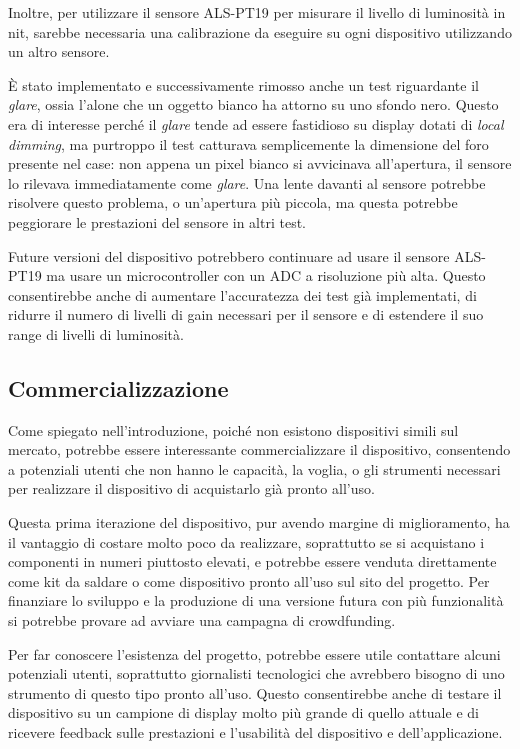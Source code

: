 Inoltre, per utilizzare il sensore ALS-PT19 per misurare il livello di luminosità in nit, sarebbe necessaria una calibrazione da eseguire su ogni dispositivo utilizzando un altro sensore.

È stato implementato e successivamente rimosso anche un test riguardante il \textit{glare}, ossia l'alone che un oggetto bianco ha attorno su uno sfondo nero. Questo era di interesse perché il \textit{glare} tende ad essere fastidioso su display dotati di \textit{local dimming}, ma purtroppo il test catturava semplicemente la dimensione del foro presente nel case: non appena un pixel bianco si avvicinava all'apertura, il sensore lo rilevava immediatamente come \textit{glare}. Una lente davanti al sensore potrebbe risolvere questo problema, o un'apertura più piccola, ma questa potrebbe peggiorare le prestazioni del sensore in altri test.

Future versioni del dispositivo potrebbero continuare ad usare il sensore ALS-PT19 ma usare un microcontroller con un ADC a risoluzione più alta. Questo consentirebbe anche di aumentare l'accuratezza dei test già implementati, di ridurre il numero di livelli di gain necessari per il sensore e di estendere il suo range di livelli di luminosità.

\subsection{Commercializzazione}
Come spiegato nell'introduzione, poiché non esistono dispositivi simili sul mercato, potrebbe essere interessante commercializzare il dispositivo, consentendo a potenziali utenti che non hanno le capacità, la voglia, o gli strumenti necessari per realizzare il dispositivo di acquistarlo già pronto all'uso.

Questa prima iterazione del dispositivo, pur avendo margine di miglioramento, ha il vantaggio di costare molto poco da realizzare, soprattutto se si acquistano i componenti in numeri piuttosto elevati, e potrebbe essere venduta direttamente come kit da saldare o come dispositivo pronto all'uso sul sito del progetto. Per finanziare lo sviluppo e la produzione di una versione futura con più funzionalità si potrebbe provare ad avviare una campagna di crowdfunding.

Per far conoscere l'esistenza del progetto, potrebbe essere utile contattare alcuni potenziali utenti, soprattutto giornalisti tecnologici che avrebbero bisogno di uno strumento di questo tipo pronto all'uso. Questo consentirebbe anche di testare il dispositivo su un campione di display molto più grande di quello attuale e di ricevere feedback sulle prestazioni e l'usabilità del dispositivo e dell'applicazione.

